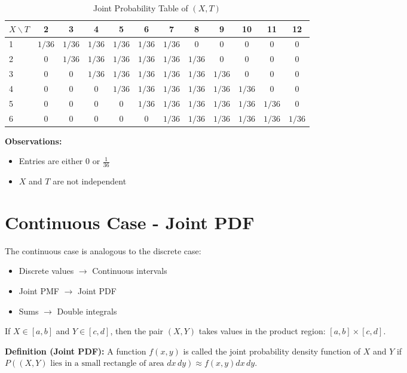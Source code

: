 \documentclass[12pt]{article}
\begin{document}
\begin{table}[h]
\centering
\begin{tabular}{lccccccccccc}
\toprule
$X \backslash T$ & 2 & 3 & 4 & 5 & 6 & 7 & 8 & 9 & 10 & 11 & 12 \\
\midrule
1 & $1/36$ & $1/36$ & $1/36$ & $1/36$ & $1/36$ & $1/36$ & 0 & 0 & 0 & 0 & 0 \\
2 & 0 & $1/36$ & $1/36$ & $1/36$ & $1/36$ & $1/36$ & $1/36$ & 0 & 0 & 0 & 0 \\
3 & 0 & 0 & $1/36$ & $1/36$ & $1/36$ & $1/36$ & $1/36$ & $1/36$ & 0 & 0 & 0 \\
4 & 0 & 0 & 0 & $1/36$ & $1/36$ & $1/36$ & $1/36$ & $1/36$ & $1/36$ & 0 & 0 \\
5 & 0 & 0 & 0 & 0 & $1/36$ & $1/36$ & $1/36$ & $1/36$ & $1/36$ & $1/36$ & 0 \\
6 & 0 & 0 & 0 & 0 & 0 & $1/36$ & $1/36$ & $1/36$ & $1/36$ & $1/36$ & $1/36$ \\
\bottomrule
\end{tabular}
\caption{Joint Probability Table of $(X,T)$}
\end{table}

\textbf{Observations:}
\begin{itemize}
    \item Entries are either 0 or $\frac{1}{36}$ 
    \item $X$ and $T$ are not independent 
\end{itemize}

\section{Continuous Case - Joint PDF}
The continuous case is analogous to the discrete case:
\begin{itemize}
    \item Discrete values $\rightarrow$ Continuous intervals 
    \item Joint PMF $\rightarrow$ Joint PDF 
    \item Sums $\rightarrow$ Double integrals 
\end{itemize}

If $X \in [a,b]$ and $Y \in [c,d]$, then the pair $(X, Y)$ takes values in the product region: $[a,b] \times [c,d]$.

\textbf{Definition (Joint PDF):}
A function $f(x,y)$ is called the joint probability density function of $X$ and $Y$ if
$P((X,Y) \text{ lies in a small rectangle of area } dx\,dy) \approx f(x,y)dx\,dy$.
\end{document}

